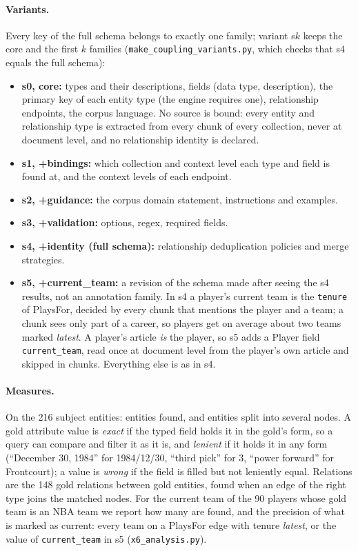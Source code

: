 \documentclass[11pt]{article}
\newcommand{\code}[1]{\texttt{#1}}
\begin{document}
\paragraph{Variants.} Every key of the full schema belongs to exactly one family; variant
s$k$ keeps the core and the first $k$ families (\code{make\_coupling\_variants.py}, which checks that
s4 equals the full schema):
\begin{itemize}
  \item \textbf{s0, core:} types and their descriptions, fields (data type, description), the primary
    key of each entity type (the engine requires one), relationship endpoints, the corpus language.
    No source is bound: every entity and relationship type is extracted from every chunk of every
    collection, never at document level, and no relationship identity is declared.
  \item \textbf{s1, +bindings:} which collection and context level each type and field is found at,
    and the context levels of each endpoint.
  \item \textbf{s2, +guidance:} the corpus domain statement, instructions and examples.
  \item \textbf{s3, +validation:} options, regex, required fields.
  \item \textbf{s4, +identity (full schema):} relationship deduplication policies and merge strategies.
  \item \textbf{s5, +current\_team:} a revision of the schema made after seeing the s4 results, not an
    annotation family. In s4 a player's current team is the \code{tenure} of PlaysFor, decided by
    every chunk that mentions the player and a team; a chunk sees only part of a career, so players
    get on average about two teams marked \emph{latest}. A player's article \emph{is} the player, so
    s5 adds a Player field \code{current\_team}, read once at document level from the player's own
    article and skipped in chunks. Everything else is as in s4.
\end{itemize}

\paragraph{Measures.} On the 216 subject entities: entities found, and entities split into several
nodes. A gold attribute value is \emph{exact} if the typed field holds it in the gold's form, so a
query can compare and filter it as it is, and \emph{lenient} if it holds it in any form
(``December 30, 1984'' for 1984/12/30, ``third pick'' for 3, ``power forward'' for Frontcourt); a
value is \emph{wrong} if the field is filled but not leniently equal. Relations are the 148 gold
relations between gold entities, found when an edge of the right type joins the matched nodes. For
the current team of the 90 players whose gold team is an NBA team we report how many are found, and
the precision of what is marked as current: every team on a PlaysFor edge with tenure \emph{latest},
or the value of \code{current\_team} in s5 (\code{x6\_analysis.py}).
\end{document}
